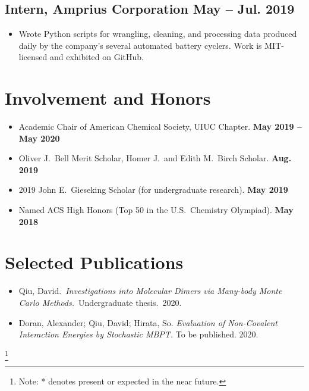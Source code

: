 \documentclass{article}
\begin{document}
\subsection{Intern, Amprius Corporation \hfill May -- Jul. 2019}
\begin{itemize}[noitemsep, nolistsep]
	\item Wrote Python scripts for wrangling, cleaning, and processing data
		produced daily by the company's several automated battery
		cyclers. Work is MIT-licensed and exhibited on GitHub.
\end{itemize}

\section{Involvement and Honors}
\begin{itemize}[noitemsep,nolistsep]
	\item Academic Chair of American Chemical Society, UIUC Chapter.
	\hfill\textbf{May 2019 -- May 2020}

	\item Oliver J.\ Bell Merit Scholar, Homer J.\ and Edith M.\ Birch
	Scholar.
	\hfill\textbf{Aug. 2019}

	\item 2019 John E.\ Gieseking Scholar (for undergraduate research).
	\hfill\textbf{May 2019}

	\item Named ACS High Honors (Top 50 in the U.S.\ Chemistry Olympiad).
	\hfill\textbf{May 2018}
\end{itemize}

\section{Selected Publications}

\begin{itemize}[noitemsep, nolistsep]
	\item Qiu, David.\ \emph{Investigations into Molecular Dimers via
		Many-body Monte Carlo Methods.}\ Undergraduate thesis.\ 2020.

	\item Doran, Alexander; Qiu, David; Hirata, So. \emph{Evaluation of
		Non-Covalent Interaction Energies by Stochastic MBPT.} To be
		published. 2020.
\end{itemize}

\newcommand\blfootnote[1]{%
	\begingroup
	\renewcommand\thefootnote{}\footnote{#1}%
	\addtocounter{footnote}{-1}%
	\endgroup
}

\blfootnote{Note: * denotes present or expected in the near future.}
\end{document}
